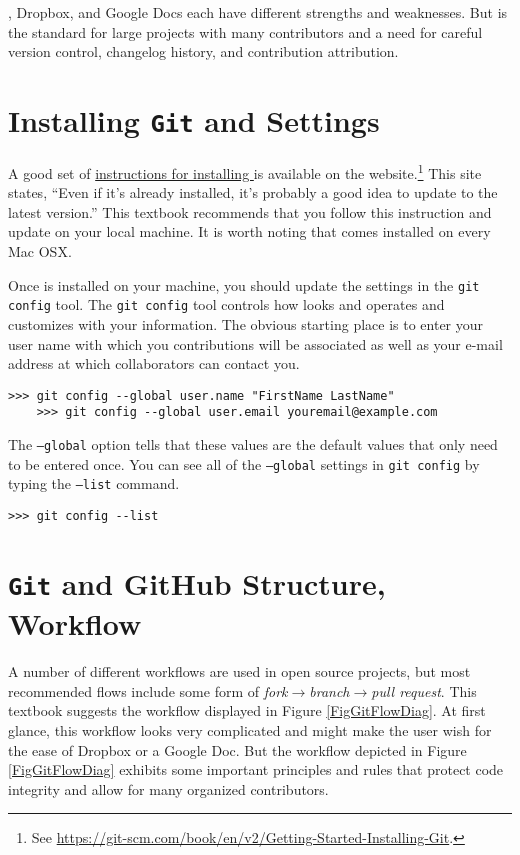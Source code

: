   \git, Dropbox, and Google Docs each have different strengths and weaknesses. But \git is the standard for large projects with many contributors and a need for careful version control, changelog history, and contribution attribution.


\section{Installing \texttt{Git} and Settings}\label{SecGitInstall}

  A good set of \href{https://git-scm.com/book/en/v2/Getting-Started-Installing-Git}{instructions for installing \git} is available on the \git website.\footnote{See \href{https://git-scm.com/book/en/v2/Getting-Started-Installing-Git}{https://git-scm.com/book/en/v2/Getting-Started-Installing-Git}.} This \git site states, ``Even if it's already installed, it’s probably a good idea to update to the latest version.'' This textbook recommends that you follow this instruction and update \git on your local machine. It is worth noting that \git comes installed on every Mac OSX.

  Once \git is installed on your machine, you should update the settings in the \texttt{git config} tool. The \texttt{git config} tool controls how \git looks and operates and customizes \git with your information. The obvious starting place is to enter your user name with which you contributions will be associated as well as your e-mail address at which collaborators can contact you.
  \begin{lstlisting}[frame=single]
    >>> git config --global user.name "FirstName LastName"
    >>> git config --global user.email youremail@example.com
  \end{lstlisting}
  The \texttt{--global} option tells \git that these values are the default values that only need to be entered once. You can see all of the \texttt{--global} settings in \texttt{git config} by typing the \texttt{--list} command.
  \begin{lstlisting}[frame=single]
    >>> git config --list
  \end{lstlisting}


\section{\texttt{Git} and GitHub Structure, Workflow}\label{SecGitStruct}

  A number of different \git workflows are used in open source projects, but most recommended flows include some form of \textit{fork}$\rightarrow$\textit{branch}$\rightarrow$\textit{pull request}. This textbook suggests the workflow displayed in Figure \ref{FigGitFlowDiag}. At first glance, this workflow looks very complicated and might make the user wish for the ease of Dropbox or a Google Doc. But the workflow depicted in Figure \ref{FigGitFlowDiag} exhibits some important principles and rules that protect code integrity and allow for many organized contributors.

